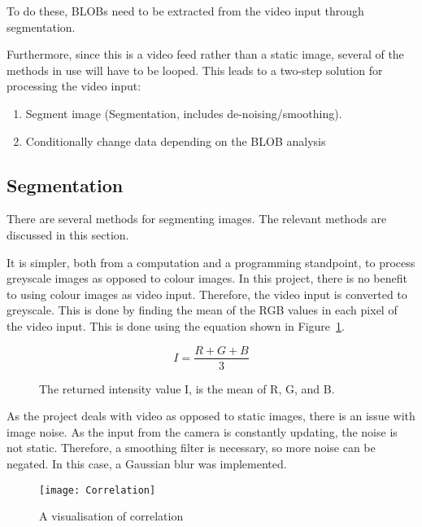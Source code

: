 To do these, BLOBs need to be extracted from the video input through segmentation.  

Furthermore, since this is a video feed rather than a static image, several of the methods in use will have to be looped. This leads to a two-step solution for processing the video input:

\begin{enumerate}
\item Segment image (Segmentation, includes de-noising/smoothing).
\item Conditionally change data depending on the BLOB analysis
\end{enumerate}


\subsection{Segmentation}
There are several methods for segmenting images. The relevant methods are discussed in this section. 

It is simpler, both from a computation and a programming standpoint, to process greyscale images as opposed to colour images. In this project, there is no benefit to using colour images as video input. Therefore, the video input is converted to greyscale. This is done by finding the mean of the RGB values in each pixel of the video input. This is done using the equation shown in Figure~\ref{fig:rgbToGreyEquation}.

\begin{figure}[h]
	\centering
	\begin{displaymath}
	I = \frac{R + G + B}{3}
	\end{displaymath}
	\caption{The returned intensity value I, is the mean of R, G, and B. \label{fig:rgbToGreyEquation}}
\end{figure}

As the project deals with video as opposed to static images, there is an issue with image noise. As the input from the camera is constantly updating, the noise is not static. Therefore, a smoothing filter is necessary, so more noise can be negated. In this case, a Gaussian blur was implemented.

\begin{figure}[h]
  \begin{center}
    \texttt{[image: Correlation]}
  \end{center}
  \caption{A visualisation of correlation \label{Fig:Correlation}\citep{moeslund_introduction_2012}}
\end{figure}

